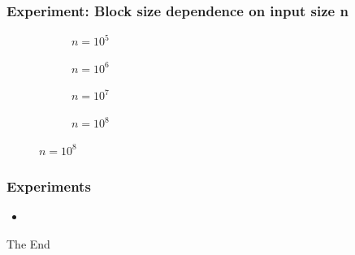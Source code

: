 \documentclass{beamer}
\begin{document}
\begin{frame}
\frametitle{Experiment: Block size dependence on input size n}
\begin{figure}\tiny
\begin{subfigure}{0.48\textwidth}
	\scalebox{.5}{}
	\caption{$n = 10^5$}
\end{subfigure}
\hfill
\begin{subfigure}{0.48\textwidth}
	\scalebox{.5}{}
	\caption{$n = 10^6$}
\end{subfigure}

\begin{subfigure}{0.48\textwidth}
	\scalebox{.5}{}
	\caption{$n = 10^7$}
\end{subfigure}
\hfill	
\begin{subfigure}{0.48\textwidth}
	\scalebox{.5}{}
	\caption{$n = 10^8$}
\end{subfigure}
\end{figure}
\end{frame}


\begin{frame}
\frametitle{Experiments}
\begin{itemize}
\item
\end{itemize}
\end{frame}


\begin{frame}
\Huge{\centerline{The End}}
\end{frame}

\end{document}
